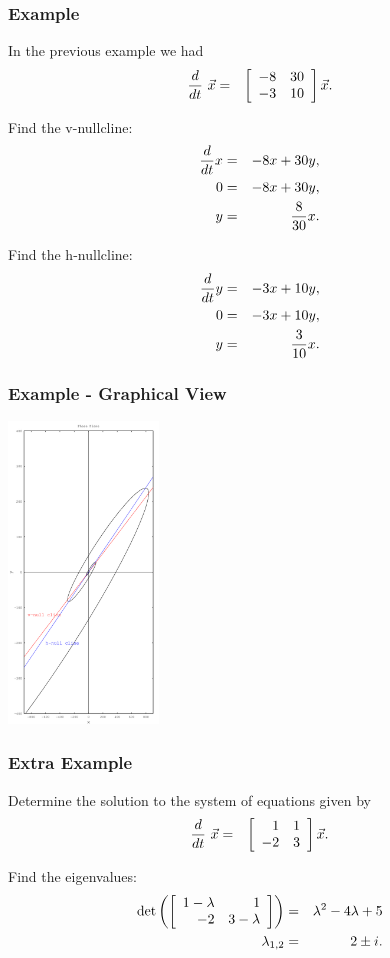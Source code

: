 \begin{frame}
  \frametitle{Example}
  
  In the previous example we had
  \begin{eqnarray*}
    \deriv{~}{t} \vec{x} & = & \arrayTwo{-8}{30}{-3}{10} \vec{x}.
  \end{eqnarray*}

  {
    Find the v-nullcline:
    \begin{eqnarray*}
      \deriv{x}{t} & = & -8x + 30y, \\
      0 & = & -8x + 30y, \\
      y & = & \frac{8}{30} x.
    \end{eqnarray*}
  }

  {
    Find the h-nullcline:
    \begin{eqnarray*}
      \deriv{y}{t} & = & -3x + 10y, \\
      0 & = & -3x + 10y, \\
      y & = &  \frac{3}{10} x.
    \end{eqnarray*}
  }


\end{frame}


\begin{frame}
  \frametitle{Example - Graphical View}

  \centerline{\includegraphics[height=8.0cm]{img/complexPhaseNullClines}}  

\end{frame}

\begin{frame}
  \frametitle{Extra Example}

  Determine the solution to the system of equations given by
  \begin{eqnarray*}
    \deriv{~}{t} \vec{x} & = & \arrayTwo{1}{1}{-2}{3} \vec{x}.
  \end{eqnarray*}

  {
    Find the eigenvalues:
    \begin{eqnarray*}
      \det\lp\arrayTwo{1-\lambda}{1}{-2}{3-\lambda}\rp 
      & = & \lambda^2-4\lambda+5 \\
      \lambda_{1,2} & = & 2 \pm i.
    \end{eqnarray*}
  }

\end{frame}

